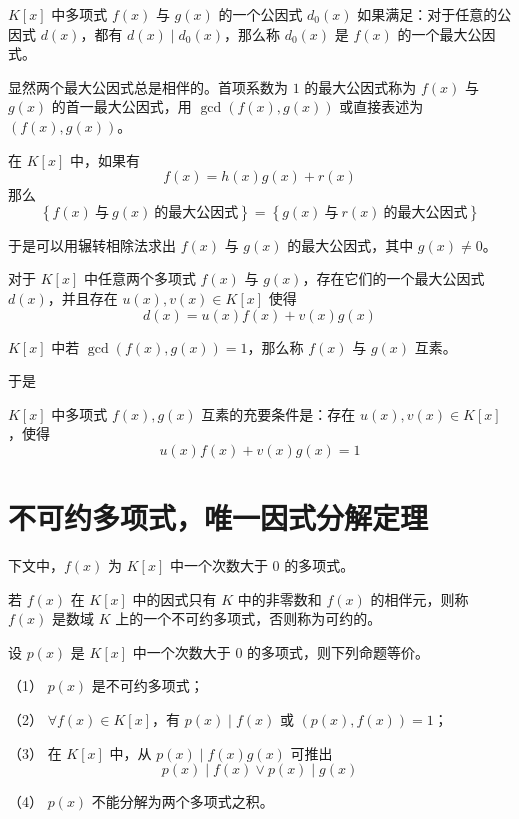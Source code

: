\begin{definition}
	$K[x]$ 中多项式 $f(x)$ 与 $g(x)$ 的一个公因式 $d_0(x)$ 如果满足：对于任意的公因式 $d(x)$，都有 $d(x) \mid d_0(x)$，那么称 $d_0(x)$ 是 $f(x)$ 的一个最大公因式。
\end{definition}

显然两个最大公因式总是相伴的。首项系数为 $1$ 的最大公因式称为 $f(x)$ 与 $g(x)$ 的首一最大公因式，用 $\gcd(f(x), g(x))$ 或直接表述为 $(f(x), g(x))$。

\begin{lemma}
	在 $K[x]$ 中，如果有
	\[f(x) = h(x)g(x) + r(x)\]
	那么
	\[\left\{f(x)\ \text{与}\ g(x)\ \text{的最大公因式}\right\} = \left\{g(x)\ \text{与}\ r(x)\ \text{的最大公因式}\right\}\]
\end{lemma}

于是可以用辗转相除法求出 $f(x)$ 与 $g(x)$ 的最大公因式，其中 $g(x) \ne 0$。

\begin{theorem}
	对于 $K[x]$ 中任意两个多项式 $f(x)$ 与 $g(x)$，存在它们的一个最大公因式 $d(x)$，并且存在 $u(x),v(x) \in K[x]$ 使得
	\[d(x) = u(x)f(x) + v(x)g(x)\]
\end{theorem}

\begin{definition}
	$K[x]$ 中若 $\gcd(f(x), g(x)) = 1$，那么称 $f(x)$ 与 $g(x)$ 互素。 
\end{definition}

于是

\begin{definition}
	$K[x]$ 中多项式 $f(x), g(x)$ 互素的充要条件是：存在 $u(x),v(x) \in K[x]$，使得
	\[u(x)f(x) + v(x)g(x) = 1\]
\end{definition}

\section{不可约多项式，唯一因式分解定理}

下文中，$f(x)$ 为 $K[x]$ 中一个次数大于 $0$ 的多项式。

\begin{definition}
	若 $f(x)$ 在 $K[x]$ 中的因式只有 $K$ 中的非零数和 $f(x)$ 的相伴元，则称 $f(x)$ 是数域 $K$ 上的一个不可约多项式，否则称为可约的。
\end{definition}

\begin{theorem}
	设 $p(x)$ 是 $K[x]$ 中一个次数大于 $0$ 的多项式，则下列命题等价。
	
	（1） $p(x)$ 是不可约多项式；
	
	（2） $\forall f(x) \in K[x]$，有 $p(x) \mid f(x)$ 或 $(p(x), f(x)) = 1$；
	
	（3） 在 $K[x]$ 中，从 $p(x) \mid f(x)g(x)$ 可推出
	\[p(x) \mid f(x) \lor p(x) \mid g(x)\]
	
	（4） $p(x)$ 不能分解为两个多项式之积。
\end{theorem}

